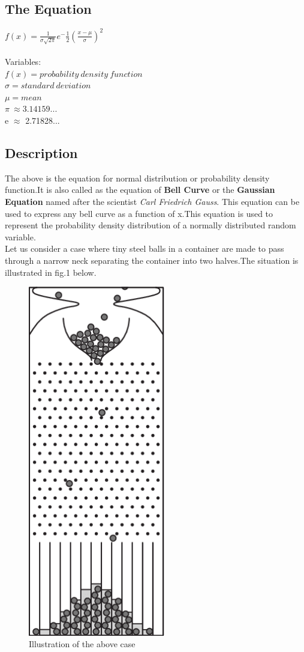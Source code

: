 \subsection{The Equation}

 {\huge $f(x)= \frac{1}{\sigma \sqrt{2\pi}} e^-\frac{1}{2}(\frac{x-\mu}{\sigma})^2$}
 \\
\\Variables:
\\$f(x) = probability \ density \ function$
 \\ $\sigma = standard \ deviation $
 \\$ \mu = mean$
 \\ $\pi \ \approx 3.14159... $
 \\ e $\approx$ 2.71828...
 \subsection{Description}
 The above is the equation for normal distribution or probability density function.It is also called as the equation of \textbf {Bell Curve} or the \textbf{Gaussian Equation} named after the scientist {\emph{Carl Friedrich Gauss}}. This equation can be used to express any bell curve as a function of x.This equation is used to represent the probability density distribution of a normally distributed random variable.
 \\Let us consider a case where tiny steel balls in a container are made to pass through a narrow neck separating the container into two halves.The situation is illustrated in fig.1 below. \\
 
 \begin{figure}[htbp]
    \centerline{\includegraphics[width=6cm]{mm20b017.png}}
    \caption{Illustration of the above case}
    \label{fig:mesh1}
\end{figure}

